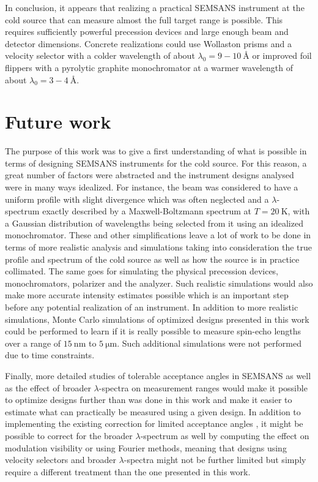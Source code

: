 In conclusion, it appears that realizing a practical SEMSANS instrument at the cold source that can measure almost the full target range is possible. This requires sufficiently powerful precession devices and large enough beam and detector dimensions. Concrete realizations could use Wollaston prisms and a velocity selector with a colder wavelength of about $\lambda_0 = 9 - 10~\unit{\angstrom}$ or improved foil flippers with a pyrolytic graphite monochromator at a warmer wavelength of about $\lambda_0 = 3 - 4~\unit{\angstrom}$.

\section{Future work}
The purpose of this work was to give a first understanding of what is possible in terms of designing SEMSANS instruments for the cold source. For this reason, a great number of factors were abstracted and the instrument designs analysed were in many ways idealized. For instance, the beam was considered to have a uniform profile with slight divergence which was often neglected and a $\lambda$-spectrum exactly described by a Maxwell-Boltzmann spectrum at $T= \SI{20}{\kelvin}$, with a Gaussian distribution of wavelengths being selected from it using an idealized monochromator. These and other simplifications leave a lot of work to be done in terms of more realistic analysis and simulations taking into consideration the true profile and spectrum of the cold source as well as how the source is in practice collimated. The same goes for simulating the physical precession devices, monochromators, polarizer and the analyzer. Such realistic simulations would also make more accurate intensity estimates possible which is an important step before any potential realization of an instrument. In addition to more realistic simulations, Monte Carlo simulations of optimized designs presented in this work could be performed to learn if it is really possible to measure spin-echo lengths over a range of $\SI{15}{\nano\meter}$ to $\SI{5}{\micro\meter}$. Such additional simulations were not performed due to time constraints.

Finally, more detailed studies of tolerable acceptance angles in SEMSANS as well as the effect of broader $\lambda$-spectra on measurement ranges would make it possible to optimize designs further than was done in this work and make it easier to estimate what can practically be measured using a given design. In addition to implementing the existing correction for limited acceptance angles \cite{kusmin2017}, it might be possible to correct for the broader $\lambda$-spectrum as well by computing the effect on modulation visibility or using Fourier methods, meaning that designs using velocity selectors and broader $\lambda$-spectra might not be further limited but simply require a different treatment than the one presented in this work.

